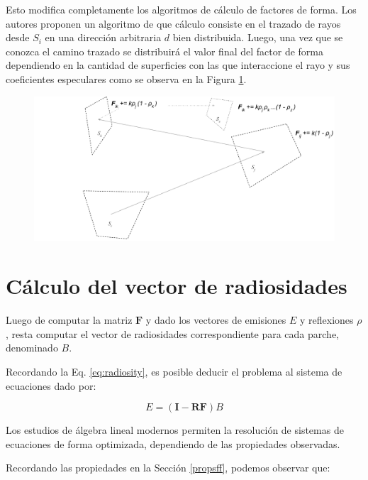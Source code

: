 Esto modifica completamente los algoritmos de cálculo de factores de forma. Los autores proponen un algoritmo de  que cálculo consiste en el trazado de rayos desde $S_{i}$ en una dirección arbitraria $d$ bien distribuida.  Luego, una vez que se conozca el camino trazado se distribuirá el valor final del factor de forma dependiendo en la cantidad de superficies con las que interaccione el rayo y sus coeficientes especulares como se observa en la Figura \ref{img:caminoespecular}.

\vspace{5mm}
\begin{figure}[H]
	\includegraphics[width=1\linewidth]{assets/extended}
	\label{img:caminoespecular}
\end{figure}

\section{Cálculo del vector de radiosidades}
\label{sec:vrad}

Luego de computar la matriz $\mathbf{F}$ y dado los vectores de emisiones $E$ y reflexiones $\rho$, resta computar el vector de radiosidades correspondiente para cada parche, denominado $B$.

Recordando la Eq. \eqref{eq:radiosity}, es posible deducir el problema al sistema de ecuaciones dado por:

\begin{equation}
	E = (\mathbf{I} - \mathbf{RF})B
\end{equation}

Los estudios de álgebra lineal modernos permiten la resolución de sistemas de ecuaciones de forma optimizada, dependiendo de las propiedades observadas.

Recordando las propiedades en la Sección \ref{propsff}, podemos observar que:


